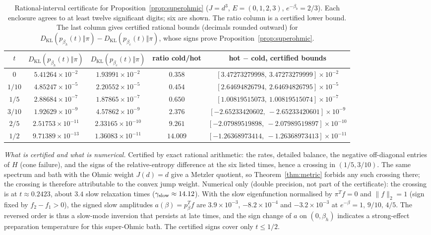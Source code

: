 \documentclass[11pt,a4paper]{article}
\theoremstyle{remark}\newtheorem{remark}[theorem]{Remark}
\newcommand{\KL}{D_{\mathrm{KL}}}
\begin{document}
\begin{table}[tb]
\centering\small
\caption{Rational-interval certificate for Proposition~\ref{prop:superohmic} ($J=d^3$, $E=(0,1,2,3)$, $e^{-\beta_b}=2/3$). Each enclosure agrees to at least twelve significant digits; six are shown. The ratio column is a certified lower bound. The last column gives certified rational bounds (decimals rounded outward) for $\KL(p_{\beta_h}(t)\Vert\pi)-\KL(p_{\beta_c}(t)\Vert\pi)$, whose signs prove Proposition~\ref{prop:superohmic}.}
\label{tab:superohmic}
\setlength{\tabcolsep}{3pt}\footnotesize\begin{tabular}{ccccc}
\toprule
$t$ & $\KL(p_{\beta_h}(t)\Vert\pi)$ & $\KL(p_{\beta_c}(t)\Vert\pi)$ & ratio cold/hot & hot $-$ cold, certified bounds\\\midrule
$0$ & $5.41264\times10^{-2}$ & $1.93991\times10^{-2}$ & $0.358$ & $[3.47273279998,\ 3.47273279999]\times10^{-2}$\\
$1/10$ & $4.85247\times10^{-5}$ & $2.20552\times10^{-5}$ & $0.454$ & $[2.64694826794,\ 2.64694826795]\times10^{-5}$\\
$1/5$ & $2.88684\times10^{-7}$ & $1.87865\times10^{-7}$ & $0.650$ & $[1.00819515073,\ 1.00819515074]\times10^{-7}$\\
$3/10$ & $1.92629\times10^{-9}$ & $4.57862\times10^{-9}$ & $2.376$ & $[-2.65233420602,\ -2.65233420601]\times10^{-9}$\\
$2/5$ & $2.51753\times10^{-11}$ & $2.33165\times10^{-10}$ & $9.261$ & $[-2.07989519898,\ -2.07989519897]\times10^{-10}$\\
$1/2$ & $9.71389\times10^{-13}$ & $1.36083\times10^{-11}$ & $14.009$ & $[-1.26368973414,\ -1.26368973413]\times10^{-11}$\\
\bottomrule
\end{tabular}
\end{table}

\emph{What is certified and what is numerical.} Certified by exact rational arithmetic: the rates, detailed balance, the negative off-diagonal entries of $H$ (cone failure), and the signs of the relative-entropy difference at the six listed times, hence a crossing in $(1/5,3/10)$. The same spectrum and bath with the Ohmic weight $J(d)=d$ give a Metzler quotient, so Theorem~\ref{thm:metric} forbids any such crossing there; the crossing is therefore attributable to the convex jump weight. Numerical only (double precision, not part of the certificate): the crossing is at $t\approx0.2423$, about $3.4$ slow relaxation times ($\gamma_{\rm slow}\approx14.12$). With the slow eigenfunction normalised by $\pi^Tf=0$ and $\|f\|_2=1$ (sign fixed by $f_2-f_1>0$), the signed slow amplitudes $a(\beta)=p_\beta^Tf$ are $3.9\times10^{-3}$, $-8.2\times10^{-4}$ and $-3.2\times10^{-3}$ at $e^{-\beta}=1,\,9/10,\,4/5$. The reversed order is thus a slow-mode inversion that persists at late times, and the sign change of $a$ on $(0,\beta_h)$ indicates a strong-effect preparation temperature for this super-Ohmic bath. The certified signs cover only $t\le1/2$.
\end{document}
